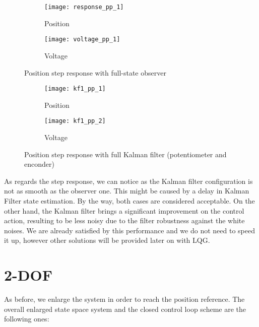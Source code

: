 \begin{figure*}[h]
	\centering
	\begin{subfigure}{0.45\columnwidth}
		\texttt{[image: response\_pp\_1]}
		\caption{Position}
	\end{subfigure}
	\begin{subfigure}{0.45\columnwidth}
		\texttt{[image: voltage\_pp\_1]}
		\caption{Voltage}
	\end{subfigure}
	\caption{Position step response with full-state observer}
	\label{fig:Position step response with full-state observer}
\end{figure*}

\begin{figure*}[h]
	\centering
	\begin{subfigure}{0.45\columnwidth}
		\texttt{[image: kf1\_pp\_1]}
		\caption{Position}
	\end{subfigure}
	\begin{subfigure}{0.45\columnwidth}
		\texttt{[image: kf1\_pp\_2]}
		\caption{Voltage}
	\end{subfigure}
	\caption{Position step response with full Kalman filter (potentiometer and enconder)}
	\label{fig:Position step response with full Kalman filter}
\end{figure*}

As regards the step response, we can notice as the Kalman filter configuration is not as smooth as the observer one. This might be caused by a delay in Kalman Filter state estimation. By the way, both cases are considered acceptable. On the other hand, the Kalman filter brings a significant improvement on the control action, resulting to be less noisy due to the filter robustness against the white noises.
We are already satisfied by this performance and we do not need to speed it up, however other solutions will be provided later on with LQG.

\section{2-DOF}
As before, we enlarge the system in order to reach the position reference. The overall enlarged state space system and the closed control loop scheme are the following ones:

